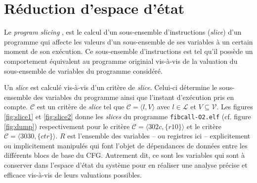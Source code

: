 \section{Réduction d'espace d'état}
\label{sec:slicing}    


    Le \emph{program slicing} \cite{Wei81}, est le calcul d'un sous-ensemble
    d'instructions (\emph{slice}) d'un programme qui affecte les valeurs d'un
    sous-ensemble de ses variables à un certain moment de son exécution. Ce
    sous-ensemble d'instructions est tel qu'il possède un comportement
    équivalent au programme originial vis-à-vis de la valuation du sous-ensemble
    de variables du programme considéré.

    Un \emph{slice} est calculé vis-à-vis d'un critère de \emph{slice}. Celui-ci
    détermine le sous-ensemble des variables du programme ainsi que l'instant
    d'exécution pris en compte. $\mathcal{C}$ est un critère de \emph{slice} tel
    que $\mathcal{C} = \langle l, V \rangle$ avec $l \in \mathcal{L}$ et $V
    \subseteq \mathcal{V}$. Les figures \ref{fig:slice1} et \ref{fig:slice2}
    donne les \emph{slices} du programme \texttt{fibcall-O2.elf} (cf. figure
    \ref{fig:dump}) respectivement pour le critère $\mathcal{C} = \langle 302c,
    \{ r10 \} \rangle$ et le critère $\mathcal{C} = \langle 3030, \{ ctr \}
    \rangle$. $R$ est l'ensemble des variables -- ou registres ici --
    explicitement ou implicitement manipulés qui font l'objet de dépendances de
    données entre les différents blocs de base du CFG. Autrement dit, ce sont
    les variables qui sont à conserver dans l'espace d'état du système pour en
    réaliser une analyse précise et efficace vis-à-vis de leurs valuations
    possibles.

